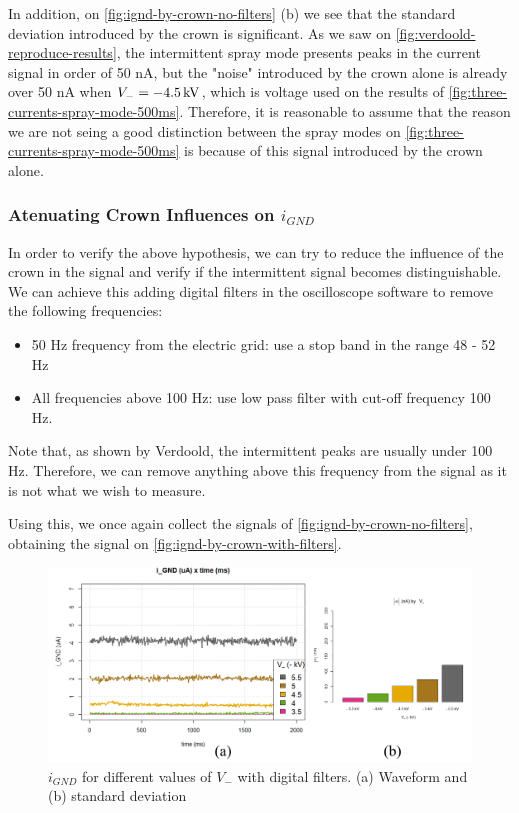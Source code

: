 \documentclass[oneside,12pt]{article}
\begin{document}
In addition, on \autoref{fig:ignd-by-crown-no-filters} (b) we see that the standard deviation introduced by the crown
is significant. As we saw on \autoref{fig:verdoold-reproduce-results}, the intermittent spray mode 
presents peaks in the current signal in order of 50 nA, but the "noise" introduced by the 
crown alone is already over 50 nA when $V_- = -4.5 \,\mathrm{kV}$, which is voltage used on the results 
of \autoref{fig:three-currents-spray-mode-500ms}. Therefore, it is reasonable to assume that the reason we are
not seing a good distinction between the spray modes on \autoref{fig:three-currents-spray-mode-500ms} is 
because of this signal introduced by the crown alone.

\subsubsection{Atenuating Crown Influences on $i_{GND}$}

In order to verify the above hypothesis, we can try to reduce the influence of the crown
in the signal and verify if the intermittent signal becomes distinguishable. We can achieve this adding digital filters 
in the oscilloscope software to remove the following frequencies:

\begin{itemize}
    \item 50 Hz frequency from the electric grid: use a stop band in the range 48 - 52 Hz
    \item All frequencies above 100 Hz: use low pass filter with cut-off frequency 100 Hz.
\end{itemize}

Note that, as shown by Verdoold, the intermittent peaks are usually under 100 Hz. Therefore, we can remove 
anything above this frequency from the signal as it is not what we wish to measure.

Using this, we once again collect the signals of \autoref{fig:ignd-by-crown-no-filters}, obtaining the signal 
on \autoref{fig:ignd-by-crown-with-filters}.

\begin{figure}[h!]
    \centering
    \includegraphics[width=1\textwidth,trim=1 1 1 1,clip]{figures/ignd-by-crown-with-filters.png}
    \caption{$i_{GND}$ for different values of $V_-$ with digital filters. (a) Waveform and (b) standard deviation}
    \label{fig:ignd-by-crown-with-filters}
\end{figure}
\end{document}
